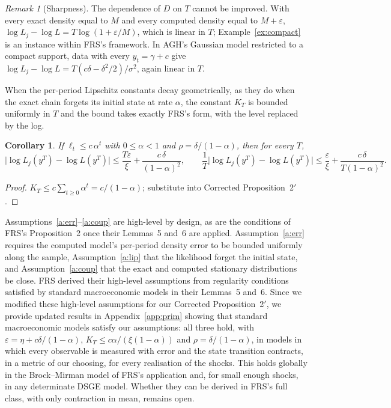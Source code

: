 \documentclass[11pt]{article}
\newtheorem{corollary}[theorem]{Corollary}
\theoremstyle{definition}
\theoremstyle{remark}
\newtheorem{remark}[theorem]{Remark}
\begin{document}
\begin{remark}[Sharpness]
The dependence of $D$ on $T$ cannot be improved. With every exact density equal to $M$ and every
computed density equal to $M + \varepsilon$, $\log L_j - \log L = T\log(1 + \varepsilon/M)$, which
is linear in $T$; Example~\ref{ex:compact} is an instance within FRS's framework. In AGH's
Gaussian model restricted to a compact support, data with every $y_t = \gamma + c$ give
$\log L_j - \log L = T(c\delta - \delta^2/2)/\sigma^2$, again linear in $T$.
\end{remark}

When the per-period Lipschitz constants decay geometrically, as they do when the exact chain
forgets its initial state at rate $\alpha$, the constant $K_T$ is bounded uniformly in $T$ and the
bound takes exactly FRS's form, with the level replaced by the log.

\begin{corollary}\label{cor:uniform}
If $\ell_t \le c\,\alpha^t$ with $0 \le \alpha < 1$ and $\rho = \delta/(1-\alpha)$, then for
every $T$,
\[
  \bigl|\log L_j(y^T) - \log L(y^T)\bigr| \le \frac{T\varepsilon}{\xi} +
  \frac{c\,\delta}{(1-\alpha)^2},
  \qquad
  \frac1T\bigl|\log L_j(y^T) - \log L(y^T)\bigr| \le \frac{\varepsilon}{\xi} +
  \frac{c\,\delta}{T(1-\alpha)^2}.
\]
\end{corollary}

\begin{proof}
$K_T \le c\sum_{t\ge0}\alpha^t = c/(1-\alpha)$; substitute into Corrected Proposition~2$'$.
\end{proof}

Assumptions~\ref{a:err}--\ref{a:coup} are high-level by design, as are the conditions of FRS's
Proposition~2 once their Lemmas~5 and~6 are applied. Assumption~\ref{a:err} requires the computed
model's per-period density error to be bounded uniformly along the sample,
Assumption~\ref{a:lip} that the likelihood forget the initial state, and Assumption~\ref{a:coup}
that the exact and computed stationary distributions be close. FRS derived their high-level
assumptions from regularity conditions satisfied by standard macroeconomic models in their
Lemmas~5 and~6. Since we
modified these high-level assumptions for our Corrected Proposition~2$'$, we provide updated
results in Appendix~\ref{app:prim} showing that standard macroeconomic models satisfy our
assumptions: all three hold, with
$\varepsilon = \eta + c\delta/(1-\alpha)$, $K_T \le c\alpha/(\xi(1-\alpha))$ and
$\rho = \delta/(1-\alpha)$, in models in which every observable is measured with error and the
state transition contracts, in a metric of our choosing, for every realisation of the shocks. This
holds globally in the Brock--Mirman model of FRS's application and, for small enough shocks, in
any determinate DSGE model. Whether they can be derived in FRS's
full class, with only contraction in mean, remains open.
\end{document}
